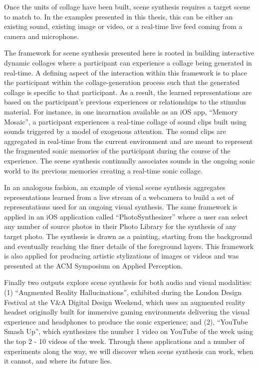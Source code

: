 Once the units of collage have been built, scene synthesis requires a target scene to match to.  In the examples presented in this thesis, this can be either an existing sound, existing image or video, or a real-time live feed coming from a camera and microphone.   



The framework for scene synthesis presented here is rooted in building interactive dynamic collages where a participant can experience a collage being generated in real-time.  A defining aspect of the interaction within this framework is to place the participant within the collage-generation process such that the generated collage is specific to that participant.  As a result, the learned representations are based on the participant's previous experiences or relationships to the stimulus material.  For instance, in one incarnation available as an iOS app, ``Memory Mosaic'', a participant experiences a real-time collage of sound clips built using sounds triggered by a model of exogenous attention.  The sound clips are aggregated in real-time from the current environment and are meant to represent the fragmented sonic memories of the participant during the course of the experience.  The scene synthesis continually associates sounds in the ongoing sonic world to its previous memories creating a real-time sonic collage.  

In an analogous fashion, an example of visual scene synthesis aggregates representations learned from a live stream of a webcamera to build a set of representations used for an ongoing visual synthesis.  The same framework is applied in an iOS application called ``PhotoSynthesizer'' where a user can select any number of source photos in their Photo Library for the synthesis of any target photo.  The synthesis is drawn as a painting, starting from the background and eventually reaching the finer details of the foreground layers.  This framework is also applied for producing artistic stylizations of images or videos and was presented at the ACM Symposium on Applied Perception.  

Finally two outputs explore scene synthesis for both audio and visual modalities: (1) ``Augmented Reality Hallucinations'', exhibited during the London Design Festival at the V\&A Digital Design Weekend, which uses an augmented reality headset originally built for immersive gaming environments delivering the visual experience and headphones to produce the sonic experience; and (2), ``YouTube Smash Up'', which synthesizes the number 1 video on YouTube of the week using the top 2 - 10 videos of the week.   Through these applications and a number of experiments along the way, we will discover when scene synthesis can work, when it cannot, and where its future lies.

